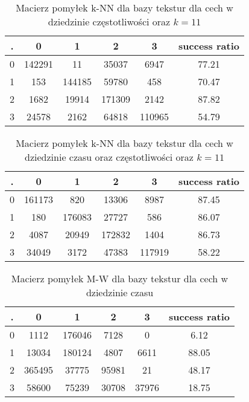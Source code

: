 \documentclass{classrep}
\begin{document}
\begin{table}[h!]
  \centering
  \caption{Macierz pomyłek k-NN dla bazy tekstur dla cech w dziedzinie częstotliwości oraz $k=11$}
  \label{tab:tab1}
  \begin{tabular}{|c|c|c|c|c|c|}
    \hline
	. & 0 & 1 & 2 & 3 & success ratio \\
    \hline
	0 & 142291 & 11 & 35037 & 6947 & 77.21\\
    \hline
	1 & 153 & 144185 & 59780 & 458 & 70.47\\
	\hline
	2 & 1682 & 19914 & 171309 & 2142 & 87.82\\
	\hline
	3 & 24578 & 2162 & 64818 & 110965 & 54.79\\   
    \hline
  \end{tabular}
\end{table}

\begin{table}[h!]
  \centering
  \caption{Macierz pomyłek k-NN dla bazy tekstur dla cech w dziedzinie czasu oraz częstotliwości oraz $k=11$}
  \label{tab:tab1}
  \begin{tabular}{|c|c|c|c|c|c|}
    \hline
	. & 0 & 1 & 2 & 3 & success ratio \\
    \hline
	0 & 161173 & 820 & 13306 & 8987 & 87.45\\
    \hline
	1 & 180 & 176083 & 27727 & 586 & 86.07\\
	\hline
	2 & 4087 & 20949 & 172832 & 1404 & 86.73\\
	\hline
	3 & 34049 & 3172 & 47383 & 117919 & 58.22\\   
    \hline
  \end{tabular}
\end{table}

\begin{table}[h!]
  \centering
  \caption{Macierz pomyłek M-W dla bazy tekstur dla cech w dziedzinie czasu}
  \label{tab:tab1}
  \begin{tabular}{|c|c|c|c|c|c|}
    \hline
 . & 0 & 1 & 2 & 3 & success ratio \\
    \hline
 0 & 1112 & 176046 & 7128 & 0 & 6.12\\
    \hline
 1 & 13034 & 180124 & 4807 & 6611 & 88.05\\
 \hline
 2 & 365495 & 37775 & 95981 & 21 & 48.17\\
 \hline
 3 & 58600 & 75239 & 30708 & 37976 & 18.75\\   
    \hline
  \end{tabular}
\end{table}
\end{document}
